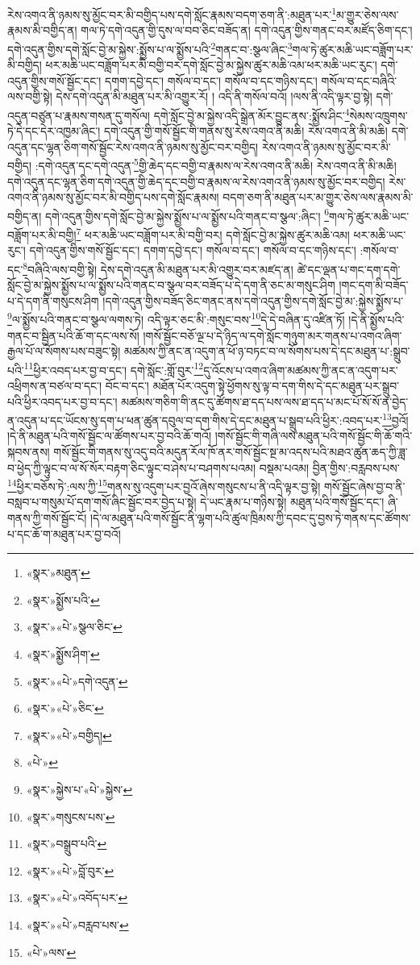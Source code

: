 རེས་འགའ་ནི་ཉམས་སུ་མྱོང་བར་མི་བགྱིད་པས་དགེ་སློང་རྣམས་བདག་ཅག་ནི་:མཐུན་པར་\footnote{«སྣར་»མཐུན་}མ་གྱུར་ཅེས་ལས་རྣམས་མི་བགྱིད་ན། གལ་ཏེ་དགེ་འདུན་གྱི་དུས་ལ་བབ་ཅིང་བཟོད་ན། དགེ་འདུན་གྱིས་གནང་བར་མཛོད་ཅིག་དང་། དགེ་འདུན་གྱིས་དགེ་སློང་བྱེ་མ་སྐྱེས་:སྨྱོས་པ་ལ་སྨྱོས་པའི་\footnote{«སྣར་»སྨྱོས་པའི་}གནང་བ་:སྩལ་ཞིང་\footnote{«སྣར་»«པེ་»སྩལ་ཅིང་}གལ་ཏེ་ཚུར་མཆི་ཡང་བཟློག་པར་མི་བགྱིད། ཕར་མཆི་ཡང་བཟློག་པར་མི་བགྱི་བར་དགེ་སློང་བྱེ་མ་སྐྱེས་ཚུར་མཆི་འམ་ཕར་མཆི་ཡང་རུང་། དགེ་འདུན་གྱིས་གསོ་སྦྱོང་དང་། དགག་དབྱེ་དང་། གསོལ་བ་དང་། གསོལ་བ་དང་གཉིས་དང་། གསོལ་བ་དང་བཞིའི་ལས་བགྱི་སྟེ། དེས་དགེ་འདུན་མི་མཐུན་པར་མི་འགྱུར་རོ། །
འདི་ནི་གསོལ་བའོ། །ལས་ནི་འདི་ལྟར་བྱ་སྟེ། དགེ་འདུན་བཙུན་པ་རྣམས་གསན་དུ་གསོལ། དགེ་སློང་བྱེ་མ་སྐྱེས་འདི་སྒྲེན་མོར་བྱུང་ནས་:སྨྱོས་ཤིང་\footnote{«སྣར་»སྨྱོས་ཤིག་}སེམས་འཁྲུགས་ཏེ་དེ་དང་དེར་འཁྱམ་ཞིང་། དགེ་འདུན་གྱི་གསོ་སྦྱོང་གི་གནས་སུ་རེས་འགའ་ནི་མཆི། རེས་འགའ་ནི་མི་མཆི། དགེ་འདུན་དང་ལྷན་ཅིག་གསོ་སྦྱོང་རེས་འགའ་ནི་ཉམས་སུ་མྱོང་བར་བགྱིད། རེས་འགའ་ནི་ཉམས་སུ་མྱོང་བར་མི་བགྱིད། :དགེ་འདུན་དང་དགེ་འདུན་\footnote{«སྣར་»«པེ་»དགེ་འདུན་}གྱི་ཆེད་དང་བགྱི་བ་རྣམས་ལ་རེས་འགའ་ནི་མཆི། རེས་འགའ་ནི་མི་མཆི། དགེ་འདུན་དང་ལྷན་ཅིག་དགེ་འདུན་གྱི་ཆེད་དང་བགྱི་བ་རྣམས་ལ་རེས་འགའ་ནི་ཉམས་སུ་མྱོང་བར་བགྱིད། རེས་འགའ་ནི་ཉམས་སུ་མྱོང་བར་མི་བགྱིད་པས་དགེ་སློང་རྣམས། བདག་ཅག་ནི་མཐུན་པར་མ་གྱུར་ཅེས་ལས་རྣམས་མི་བགྱིད་ན། དགེ་འདུན་གྱིས་དགེ་སློང་བྱེ་མ་སྐྱེས་སྨྱོས་པ་ལ་སྨྱོས་པའི་གནང་བ་སྩལ་:ཞིང་། \footnote{«སྣར་»«པེ་»ཅིང་}གལ་ཏེ་ཚུར་མཆི་ཡང་བཟློག་པར་མི་བགྱི།\footnote{«སྣར་»«པེ་»བགྱིད།} ཕར་མཆི་ཡང་བཟློག་པར་མི་བགྱི་བར། དགེ་སློང་བྱེ་མ་སྐྱེས་ཚུར་མཆི་འམ། ཕར་མཆི་ཡང་རུང་། དགེ་འདུན་གྱིས་གསོ་སྦྱོང་དང་། དགག་དབྱེ་དང་། གསོལ་བ་དང་། གསོལ་བ་དང་གཉིས་དང་། :གསོལ་བ་དང་\footnote{«པེ་»}བཞིའི་ལས་བགྱི་སྟེ། དེས་དགེ་འདུན་མི་མཐུན་པར་མི་འགྱུར་བར་མཛད་ན། ཚེ་དང་ལྡན་པ་གང་དག་དགེ་སློང་བྱེ་མ་སྐྱེས་སྨྱོས་པ་ལ་སྨྱོས་པའི་གནང་བ་སྩལ་བར་བཟོད་པ་དེ་དག་ནི་ཅང་མ་གསུང་ཤིག །གང་དག་མི་བཟོད་པ་དེ་དག་ནི་གསུངས་ཤིག །དགེ་འདུན་གྱིས་བཟོད་ཅིང་གནང་ནས་དགེ་འདུན་གྱིས་དགེ་སློང་བྱེ་མ་:སྐྱེས་སྨྱོས་པ་\footnote{«སྣར་»སྐྱེས་པ་«པེ་»སྐྱེས་}ལ་སྨྱོས་པའི་གནང་བ་སྩལ་ལགས་ཏེ། འདི་ལྟར་ཅང་མི་:གསུང་བས་\footnote{«སྣར་»གསུངས་པས་}དེ་དེ་བཞིན་དུ་འཛིན་ཏོ། །དེ་ནི་སྨྱོས་པའི་གནང་བ་སྦྱིན་པའི་ཆོ་ག་དང་ལས་སོ། །གསོ་སྦྱོང་བཅོ་ལྔ་པ་དེ་ཉིད་ལ་དགེ་སློང་གཉུག་མར་གནས་པ་འགའ་ཞིག་རྒྱལ་པོ་ལ་སོགས་པས་བཟུང་སྟེ། མཚམས་ཀྱི་ནང་ན་འདུག་ན་ཕོ་ཉ་བཏང་བ་ལ་སོགས་པས་དེ་དང་མཐུན་པ་:སྒྲུབ་པའི་\footnote{«སྣར་»བསྒྲུབ་པའི་}ཕྱིར་འབད་པར་བྱ་བ་དང་། དགེ་སློང་:གློ་བུར་\footnote{«སྣར་»«པེ་»བློ་བུར་}དུ་འོངས་པ་འགའ་ཞིག་མཚམས་ཀྱི་ནང་ན་འདུག་པར་འཕྲིགས་ན་བཙལ་བ་དང་། བོང་བ་དང་། མཐོན་པོར་འདུག་སྟེ་ཕྱོགས་སུ་ལྟ་བ་དག་གིས་དེ་དང་མཐུན་པར་སྒྲུབ་པའི་ཕྱིར་འབད་པར་བྱ་བ་དང་། མཚམས་གཅིག་གི་ནང་དུ་ཚོགས་ཐ་དད་པས་ལས་ཐ་དད་པ་མང་པོ་སོ་སོ་ན་བྱེད་ན་འདུན་པ་དང་ཡོངས་སུ་དག་པ་ཕན་ཚུན་དབུལ་བ་དག་གིས་དེ་དང་མཐུན་པ་སྒྲུབ་པའི་ཕྱིར་:འབད་པར་\footnote{«སྣར་»«པེ་»འབོད་པར་}བྱའོ། །དེ་ནི་མཐུན་པའི་གསོ་སྦྱོང་ལ་ཚོགས་པར་བྱ་བའི་ཆོ་གའོ། །གསོ་སྦྱོང་གི་གཞི་ལས་མཐུན་པའི་གསོ་སྦྱོང་གི་ཆོ་གའི་སྐབས་ནས། གསོ་སྦྱོང་གི་གནས་སུ་འདུ་བའི་མདུན་རོལ་ཁོ་ནར་གསོ་སྦྱོང་སྔ་མ་འདས་པའི་མཐའ་ཚུན་ཆད་ཀྱི་ཟླ་བ་ཕྱེད་ཀྱི་ལྟུང་བ་ལ་སོ་སོར་བརྟག་ཅིང་ལྟུང་བ་ཤེས་པ་བཤགས་པའམ། བསྡམ་པའམ། བྱིན་གྱིས་:བརླབས་པས་\footnote{«སྣར་»«པེ་»བརླབ་པས་}ཕྱིར་བཅོས་ཏེ་:ལས་ཀྱི་\footnote{«པེ་»ལས་}གནས་སུ་འདུག་པར་བྱའོ་ཞེས་གསུངས་པ་ནི་འདི་ལྟར་བྱ་སྟེ། གསོ་སྦྱོང་ཞེས་བྱ་བ་ནི་བསླབ་པ་གསུམ་པོ་དག་གསོ་ཞིང་སྦྱོང་བར་བྱེད་པ་སྟེ། དེ་ཡང་རྣམ་པ་གཉིས་སྟེ། མཐུན་པའི་གསོ་སྦྱོང་དང་། ཞི་གནས་ཀྱི་གསོ་སྦྱོང་ངོ། །དེ་ལ་མཐུན་པའི་གསོ་སྦྱོང་ནི་ལྷག་པའི་ཚུལ་ཁྲིམས་ཀྱི་དབང་དུ་བྱས་ཏེ་གནས་དང་ཚོགས་པ་དང་ཆོ་ག་མཐུན་པར་བྱ་བའོ། 
